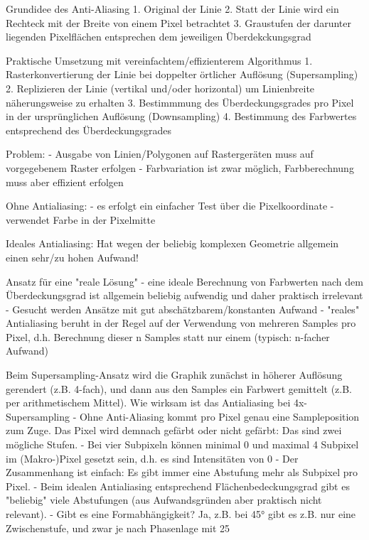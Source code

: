 \documentclass[10pt,landscape]{article}
\begin{document}
\begin{multicols}{3}
Grundidee des Anti-Aliasing
1. Original der Linie
2. Statt der Linie wird ein Rechteck mit der Breite von einem Pixel betrachtet
3. Graustufen der darunter liegenden Pixelflächen entsprechen dem jeweiligen Überdekckungsgrad

Praktische Umsetzung mit vereinfachtem/effizienterem Algorithmus
1. Rasterkonvertierung der Linie bei doppelter örtlicher Auflösung (Supersampling)
2. Replizieren der Linie (vertikal und/oder horizontal) um Linienbreite näherungsweise zu erhalten
3. Bestimmmung des Überdeckungsgrades pro Pixel in der ursprünglichen Auflösung (Downsampling)
4. Bestimmung des Farbwertes entsprechend des Überdeckungsgrades

Problem:
- Ausgabe von Linien/Polygonen auf Rastergeräten muss auf vorgegebenem Raster erfolgen
- Farbvariation ist zwar möglich, Farbberechnung muss aber effizient erfolgen

Ohne Antialiasing:
- es erfolgt ein einfacher Test über die Pixelkoordinate
- verwendet Farbe in der Pixelmitte

Ideales Antialiasing: Hat wegen der beliebig komplexen Geometrie allgemein einen sehr/zu hohen Aufwand!

Ansatz für eine "reale Lösung"
- eine ideale Berechnung von Farbwerten nach dem Überdeckungsgrad ist allgemein beliebig aufwendig und daher praktisch irrelevant
- Gesucht werden Ansätze mit gut abschätzbarem/konstanten Aufwand
- "reales" Antialiasing beruht in der Regel auf der Verwendung von mehreren Samples pro Pixel, d.h. Berechnung dieser n Samples statt nur einem (typisch: n-facher Aufwand)

Beim Supersampling-Ansatz wird die Graphik zunächst in höherer Auflösung gerendert (z.B. 4-fach), und dann aus den Samples ein Farbwert gemittelt (z.B. per arithmetischem Mittel).
Wie wirksam ist das Antialiasing bei 4x-Supersampling
- Ohne Anti-Aliasing kommt pro Pixel genau eine Sampleposition zum Zuge. Das Pixel wird demnach gefärbt oder nicht gefärbt: Das sind zwei mögliche Stufen.
- Bei vier Subpixeln können minimal 0 und maximal 4 Subpixel im (Makro-)Pixel gesetzt sein, d.h. es sind Intensitäten von 0%
- Der Zusammenhang ist einfach: Es gibt immer eine Abstufung mehr als Subpixel pro Pixel.
- Beim idealen Antialiasing entsprechend Flächenbedeckungsgrad gibt es "beliebig" viele Abstufungen (aus Aufwandsgründen aber praktisch nicht relevant).
- Gibt es eine Formabhängigkeit? Ja, z.B. bei 45° gibt es z.B. nur eine Zwischenstufe, und zwar je nach Phasenlage mit 25%


\end{multicols}
\end{document}
